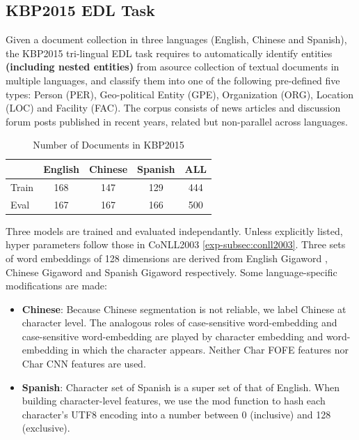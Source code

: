 \documentclass[11pt,a4paper]{article}
\begin{document}
\subsection{KBP2015 EDL Task}
\label{subsec:kbp2015}

Given a document collection in three languages (English, Chinese and Spanish), the KBP2015 tri-lingual EDL task \cite{kbpoverview2015} requires to automatically identify entities \textbf{(including nested entities)}  from asource collection of textual documents in multiple
languages, and classify them into one of the following pre-defined
five types: Person (PER), Geo-political Entity
(GPE), Organization (ORG), Location (LOC)
and Facility (FAC). The corpus consists of news articles and discussion forum posts published in recent years, related but non-parallel across languages. 

\begin{table}
		\centering
		\begin{tabular}{|l|c|c|c|c|}
			\hline
			& English & Chinese & Spanish & ALL \\
			\hline
			Train & 168 & 147 & 129 & 444 \\
			Eval & 167 & 167 & 166 & 500 \\
			\hline
		\end{tabular}%
	\caption{Number of Documents in KBP2015}
	\label{tbl:kbp2015stat}
\end{table}


Three models are trained and evaluated independantly. Unless explicitly listed, hyper parameters follow those in CoNLL2003 \ref{exp-subsec:conll2003}. Three sets of word embeddings of 128 dimensions are derived from English Gigaword \cite{parker2011english}, Chinese Gigaword \cite{graff2005chinese} and Spanish Gigaword \cite{mendonca2009spanish} respectively. Some language-specific modifications are made:

\begin{itemize}
	\item {\bf Chinese}: Because Chinese segmentation is not reliable, we label Chinese at character level. The analogous roles of case-sensitive word-embedding and case-sensitive word-embedding are played by character embedding and word-embedding in which the character appears. Neither Char FOFE features nor Char CNN features are used. 
	\item {\bf Spanish}: Character set of Spanish is a super set of that of English. When building character-level features, we use the mod function to hash each character's UTF8 encoding into a number between 0 (inclusive) and 128 (exclusive).
\end{itemize}
\end{document}
